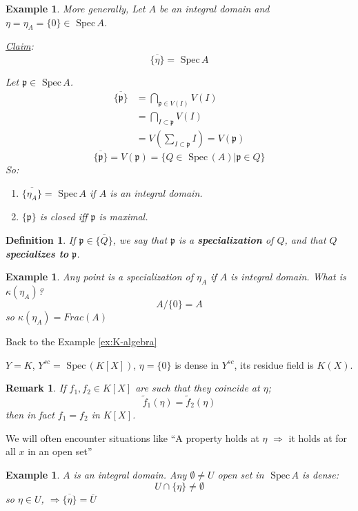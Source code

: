 \documentclass[11pt]{article}
\newtheorem{dfn}[thm]{Definition}
\newtheorem{rmk}[thm]{Remark}
\newtheorem{ex}[thm]{Example}
\newcommand{\spec}{\text{ Spec}\,}
\newcommand{\scp}{{\mathfrak p}}
\newcommand{\Lrta}{\Longrightarrow}
\begin{document}
\begin{ex}
More generally, Let $A$ be an integral domain and $\eta=\eta_A=\{0\}\in\spec A$.

\underline{Claim}: 
$$
\overline{\{\eta\}}=\spec A
$$

Let $\scp\in\spec A$.
$$
\begin{aligned}
\overline{\{\scp\}}&=\bigcap_{\scp\in V(I)}V(I)\\
&=\bigcap_{I\subset \scp}V(I)\\
&=V(\sum_{I\subset\scp} I )=V(\scp)
\end{aligned}
$$
$$
\overline{\{\scp\}}=V(\scp)=\{Q\in\spec(A)|\scp\in Q\}
$$
So:
\begin{enumerate}
\item $\overline{\{\eta_A\}}=\spec A$ if $A$ is an integral domain.
\item $\{\scp\}$ is closed iff $\scp$ is maximal.
\end{enumerate}
\end{ex}

\begin{dfn}
If $\scp\in\overline{\{Q\}}$, we say that $\scp$ is a \textbf{specialization} of $Q$, and that $Q$ \textbf{specializes to} $\scp$.
\end{dfn}

\begin{ex}
Any point is a specialization of $\eta_A$ if $A$ is integral domain. What is $\kappa(\eta_A)$?
$$
A/\{0\}=A
$$
so $\kappa(\eta_A)=Frac(A)$
\end{ex}

Back to the Example \ref{ex:K-algebra}

$Y=K$, $Y^{sc}=\spec (K[X])$, $\eta=\{0\}$ is dense in $Y^{sc}$, its residue field is $K(X)$.

\begin{rmk}
If $f_1,f_2\in K[X]$ are such that they coincide at $\eta$;
$$
\tilde{f}_1(\eta)=\tilde{f}_2(\eta)
$$
then in fact $  f_1=f_2$ in $K[X]$.
\end{rmk}

We will often encounter situations like ``A property holds at $\eta$ $\Lrta$ it holds at for all $x$ in an open set''

\begin{ex}
$A$ is an integral domain. Any $\emptyset \neq U$ open set in $\spec A$ is dense:
$$
U\cap \{\eta\}\neq \emptyset
$$
so $\eta\in U$, $\Lrta \overline{\{\eta\}}=\overline{U}$
\end{ex}
\end{document}
